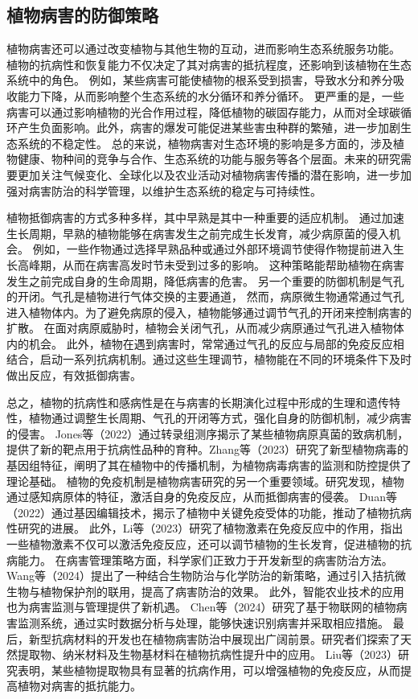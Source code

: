 \documentclass[AutoFakeBold]{LZUThesis-PgD&PhD}
\begin{document}
\subsection{植物病害的防御策略}

植物病害还可以通过改变植物与其他生物的互动，进而影响生态系统服务功能。
植物的抗病性和恢复能力不仅决定了其对病害的抵抗程度，还影响到该植物在生态系统中的角色。
例如，某些病害可能使植物的根系受到损害，导致水分和养分吸收能力下降，从而影响整个生态系统的水分循环和养分循环\cite{Schultz2010}。
更严重的是，一些病害可以通过影响植物的光合作用过程，降低植物的碳固存能力，从而对全球碳循环产生负面影响\cite{Barton2011}。此外，病害的爆发可能促进某些害虫种群的繁殖，进一步加剧生态系统的不稳定性。
总的来说，植物病害对生态环境的影响是多方面的，涉及植物健康、物种间的竞争与合作、生态系统的功能与服务等各个层面。未来的研究需要更加关注气候变化、全球化以及农业活动对植物病害传播的潜在影响，进一步加强对病害防治的科学管理，以维护生态系统的稳定与可持续性。

植物抵御病害的方式多种多样，其中早熟是其中一种重要的适应机制。
通过加速生长周期，早熟的植物能够在病害发生之前完成生长发育，减少病原菌的侵入机会。
例如，一些作物通过选择早熟品种或通过外部环境调节使得作物提前进入生长高峰期，从而在病害高发时节未受到过多的影响。
这种策略能帮助植物在病害发生之前完成自身的生命周期，降低病害的危害。
另一个重要的防御机制是气孔的开闭。气孔是植物进行气体交换的主要通道，
然而，病原微生物通常通过气孔进入植物体内。为了避免病原的侵入，植物能够通过调节气孔的开闭来控制病害的扩散。
在面对病原威胁时，植物会关闭气孔，从而减少病原通过气孔进入植物体内的机会。
此外，植物在遇到病害时，常常通过气孔的反应与局部的免疫反应相结合，启动一系列抗病机制。通过这些生理调节，植物能在不同的环境条件下及时做出反应，有效抵御病害。

总之，植物的抗病性和感病性是在与病害的长期演化过程中形成的生理和遗传特性，植物通过调整生长周期、气孔的开闭等方式，强化自身的防御机制，减少病害的侵害。
Jones等（2022）通过转录组测序揭示了某些植物病原真菌的致病机制，提供了新的靶点用于抗病性品种的育种\cite{jones2022}。Zhang等（2023）研究了新型植物病毒的基因组特征，阐明了其在植物中的传播机制，为植物病毒病害的监测和防控提供了理论基础\cite{zhang2023genomic}。
植物的免疫机制是植物病害研究的另一个重要领域。研究发现，植物通过感知病原体的特征，激活自身的免疫反应，从而抵御病害的侵袭。
Duan等（2022）通过基因编辑技术，揭示了植物中关键免疫受体的功能，推动了植物抗病性研究的进展\cite{duan2022gene}。
此外，Li等（2023）研究了植物激素在免疫反应中的作用，指出一些植物激素不仅可以激活免疫反应，还可以调节植物的生长发育，促进植物的抗病能力\cite{li2023role}。
在病害管理策略方面，科学家们正致力于开发新型的病害防治方法。
Wang等（2024）提出了一种结合生物防治与化学防治的新策略，通过引入拮抗微生物与植物保护剂的联用，提高了病害防治的效果\cite{wang2024novel}。
此外，智能农业技术的应用也为病害监测与管理提供了新机遇。
Chen等（2024）研究了基于物联网的植物病害监测系统，通过实时数据分析与处理，能够快速识别病害并采取相应措施\cite{chen2024iot}。
最后，新型抗病材料的开发也在植物病害防治中展现出广阔前景。研究者们探索了天然提取物、纳米材料及生物基材料在植物抗病性提升中的应用。
Liu等（2023）研究表明，某些植物提取物具有显著的抗病作用，可以增强植物的免疫反应，从而提高植物对病害的抵抗能力\cite{liu2023natural}。
\end{document}
